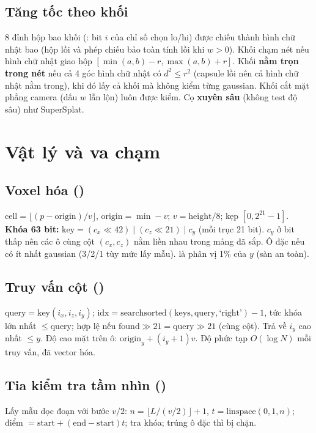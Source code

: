 \subsection{Tăng tốc theo khối}
8 đỉnh hộp bao khối (: bit $i$ của chỉ số chọn lo/hi) được chiếu thành hình chữ nhật bao (hộp lồi và phép chiếu bảo toàn tính lồi khi $w>0$). Khối chạm nét nếu hình chữ nhật giao hộp $[\min(a,b)-r,\max(a,b)+r]$. Khối \textbf{nằm trọn trong nét} nếu cả 4 góc hình chữ nhật có $d^2\le r^2$ (capsule lồi nên cả hình chữ nhật nằm trong), khi đó lấy cả khối mà không kiểm từng gaussian. Khối cắt mặt phẳng camera (dấu $w$ lẫn lộn) luôn được kiểm. Cọ \textbf{xuyên sâu} (không test độ sâu) như SuperSplat.

\section{Vật lý và va chạm}\label{s:phys}

\subsection{Voxel hóa ()}
$\mathrm{cell}=\lfloor(p-\mathrm{origin})/v\rfloor$, $\mathrm{origin}=\min-v$; $v=\mathrm{height}/8$; kẹp $[0,2^{21}-1]$. \textbf{Khóa 63 bit:} $\mathrm{key}=(c_x\ll42)\mid(c_z\ll21)\mid c_y$ (mỗi trục 21 bit). $c_y$ ở bit thấp nên các ô cùng cột $(c_x,c_z)$ nằm liền nhau trong mảng đã sắp. Ô đặc nếu có ít nhất  gaussian (3/2/1 tùy mức lấy mẫu).  là phân vị 1\% của $y$ (sàn an toàn).

\subsection{Truy vấn cột ()}
$\mathrm{query}=\mathrm{key}(i_x,i_z,i_y)$; $\mathrm{idx}=\mathrm{searchsorted}(\mathrm{keys},\mathrm{query},\text{`right'})-1$, tức khóa lớn nhất $\le\mathrm{query}$; hợp lệ nếu $\mathrm{found}\gg21=\mathrm{query}\gg21$ (cùng cột). Trả về $i_y$ cao nhất $\le y$. Độ cao mặt trên ô: $\mathrm{origin}_y+(i_y+1)v$. Độ phức tạp $O(\log N)$ mỗi truy vấn, đã vector hóa.

\subsection{Tia kiểm tra tầm nhìn ()}
Lấy mẫu dọc đoạn với bước $v/2$: $n=\lfloor L/(v/2)\rfloor+1$, $t=\mathrm{linspace}(0,1,n)$; điểm $=\mathrm{start}+(\mathrm{end}-\mathrm{start})t$; tra khóa; trúng ô đặc thì bị chặn.

